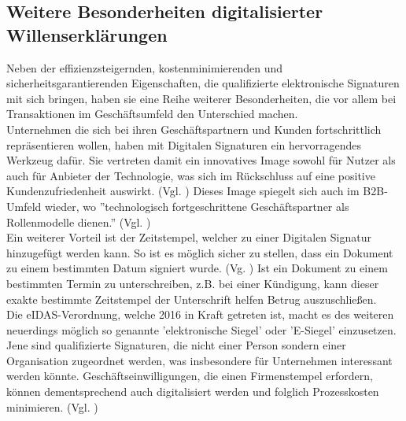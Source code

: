 \documentclass[deutsch]{lib/llncs/llncs}
\begin{document}
\subsection{Weitere Besonderheiten digitalisierter Willenserklärungen}
Neben der effizienzsteigernden, kostenminimierenden und sicherheitsgarantierenden Eigenschaften, die qualifizierte elektronische Signaturen mit sich bringen, haben sie eine Reihe weiterer Besonderheiten, die vor allem bei Transaktionen im Geschäftsumfeld den Unterschied machen. \\
Unternehmen die sich bei ihren Geschäftspartnern und Kunden fortschrittlich repräsentieren wollen, haben mit Digitalen Signaturen ein hervorragendes Werkzeug dafür. Sie vertreten damit ein innovatives Image sowohl für Nutzer als auch für Anbieter der Technologie, was sich im Rückschluss auf eine positive Kundenzufriedenheit auswirkt. (Vgl. \cite[S. 7]{Zitat05}) Dieses Image spiegelt sich auch im B2B-Umfeld wieder, wo ''technologisch fortgeschrittene Geschäftspartner als Rollenmodelle dienen.'' (Vgl. \cite[S. 12]{Zitat05}) \\
Ein weiterer Vorteil ist der Zeitstempel, welcher zu einer Digitalen Signatur hinzugefügt werden kann. So ist es möglich sicher zu stellen, dass ein Dokument zu einem bestimmten Datum signiert wurde. (Vg. \cite[S. 7]{Zitat05}) Ist ein Dokument zu einem bestimmten Termin zu unterschreiben, z.B. bei einer Kündigung, kann dieser exakte bestimmte Zeitstempel der Unterschrift helfen Betrug auszuschließen. \\
Die eIDAS-Verordnung, welche 2016 in Kraft getreten ist, macht es des weiteren neuerdings möglich so genannte 'elektronische Siegel' oder 'E-Siegel' einzusetzen. Jene sind qualifizierte Signaturen, die nicht einer Person sondern einer Organisation zugeordnet werden, was insbesondere für Unternehmen interessant werden könnte. Geschäftseinwilligungen, die einen Firmenstempel erfordern, können dementsprechend auch digitalisiert werden und folglich Prozesskosten minimieren. (Vgl. \cite[S. 30-31]{Zitat05})
\end{document}
